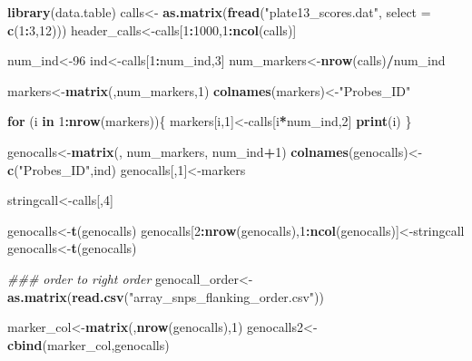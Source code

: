 \documentclass[
]{article}
\newenvironment{Shaded}{\begin{snugshade}}{\end{snugshade}}
\newcommand{\CommentTok}[1]{\textcolor[rgb]{0.56,0.35,0.01}{\textit{#1}}}
\newcommand{\ControlFlowTok}[1]{\textcolor[rgb]{0.13,0.29,0.53}{\textbf{#1}}}
\newcommand{\DataTypeTok}[1]{\textcolor[rgb]{0.13,0.29,0.53}{#1}}
\newcommand{\DecValTok}[1]{\textcolor[rgb]{0.00,0.00,0.81}{#1}}
\newcommand{\KeywordTok}[1]{\textcolor[rgb]{0.13,0.29,0.53}{\textbf{#1}}}
\newcommand{\NormalTok}[1]{#1}
\newcommand{\OperatorTok}[1]{\textcolor[rgb]{0.81,0.36,0.00}{\textbf{#1}}}
\newcommand{\StringTok}[1]{\textcolor[rgb]{0.31,0.60,0.02}{#1}}
\begin{document}
\begin{Shaded}
\begin{Highlighting}[]
\KeywordTok{library}\NormalTok{(data.table)}
\NormalTok{calls<-}\StringTok{ }\KeywordTok{as.matrix}\NormalTok{(}\KeywordTok{fread}\NormalTok{(}\StringTok{"plate13_scores.dat"}\NormalTok{, }\DataTypeTok{select =} \KeywordTok{c}\NormalTok{(}\DecValTok{1}\OperatorTok{:}\DecValTok{3}\NormalTok{,}\DecValTok{12}\NormalTok{)))}
\NormalTok{header_calls<-calls[}\DecValTok{1}\OperatorTok{:}\DecValTok{1000}\NormalTok{,}\DecValTok{1}\OperatorTok{:}\KeywordTok{ncol}\NormalTok{(calls)]}

\NormalTok{num_ind<-}\DecValTok{96}
\NormalTok{ind<-calls[}\DecValTok{1}\OperatorTok{:}\NormalTok{num_ind,}\DecValTok{3}\NormalTok{]}
\NormalTok{num_markers<-}\KeywordTok{nrow}\NormalTok{(calls)}\OperatorTok{/}\NormalTok{num_ind}

\NormalTok{markers<-}\KeywordTok{matrix}\NormalTok{(,num_markers,}\DecValTok{1}\NormalTok{)}
\KeywordTok{colnames}\NormalTok{(markers)<-}\StringTok{"Probes_ID"}

\ControlFlowTok{for}\NormalTok{ (i }\ControlFlowTok{in} \DecValTok{1}\OperatorTok{:}\KeywordTok{nrow}\NormalTok{(markers))\{}
\NormalTok{  markers[i,}\DecValTok{1}\NormalTok{]<-calls[i}\OperatorTok{*}\NormalTok{num_ind,}\DecValTok{2}\NormalTok{]}
  \KeywordTok{print}\NormalTok{(i)}
\NormalTok{\}}


\NormalTok{genocalls<-}\KeywordTok{matrix}\NormalTok{(, num_markers, num_ind}\OperatorTok{+}\DecValTok{1}\NormalTok{)}
\KeywordTok{colnames}\NormalTok{(genocalls)<-}\KeywordTok{c}\NormalTok{(}\StringTok{"Probes_ID"}\NormalTok{,ind)}
\NormalTok{genocalls[,}\DecValTok{1}\NormalTok{]<-markers}

\NormalTok{stringcall<-calls[,}\DecValTok{4}\NormalTok{]}

\NormalTok{genocalls<-}\KeywordTok{t}\NormalTok{(genocalls)}
\NormalTok{genocalls[}\DecValTok{2}\OperatorTok{:}\KeywordTok{nrow}\NormalTok{(genocalls),}\DecValTok{1}\OperatorTok{:}\KeywordTok{ncol}\NormalTok{(genocalls)]<-stringcall}
\NormalTok{genocalls<-}\KeywordTok{t}\NormalTok{(genocalls)}


\CommentTok{### order to right order}
\NormalTok{genocall_order<-}\KeywordTok{as.matrix}\NormalTok{(}\KeywordTok{read.csv}\NormalTok{(}\StringTok{"array_snps_flanking_order.csv"}\NormalTok{))}

\NormalTok{marker_col<-}\KeywordTok{matrix}\NormalTok{(,}\KeywordTok{nrow}\NormalTok{(genocalls),}\DecValTok{1}\NormalTok{)}
\NormalTok{genocalls2<-}\KeywordTok{cbind}\NormalTok{(marker_col,genocalls)}


\end{Highlighting}
\end{Shaded}
\end{document}
